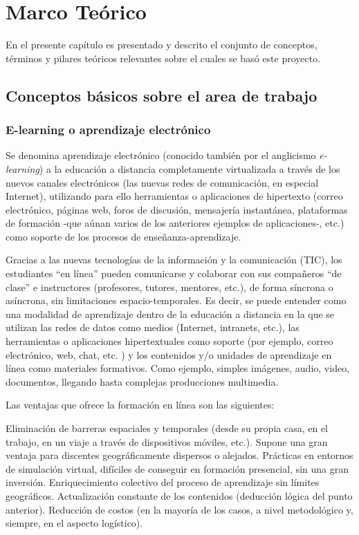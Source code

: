 \chapter{Marco Teórico}
\thispagestyle{empty} %

En el presente capítulo es presentado y descrito el conjunto de conceptos, términos y pilares teóricos relevantes sobre el cuales se basó este proyecto.

\section{Conceptos básicos sobre el area de trabajo}

\subsection{E-learning o aprendizaje electrónico}

Se denomina aprendizaje electrónico (conocido también por el anglicismo \emph{e-learning}) a la educación a distancia completamente virtualizada a través de los nuevos canales electrónicos (las nuevas redes de comunicación, en especial Internet), utilizando para ello herramientas o aplicaciones de hipertexto (correo electrónico, páginas web, foros de discusión, mensajería instantánea, plataformas de formación -que aúnan varios de los anteriores ejemplos de aplicaciones-, etc.) como soporte de los procesos de enseñanza-aprendizaje.

Gracias a las nuevas tecnologías de la información y la comunicación (TIC), los estudiantes “en línea” pueden comunicarse y colaborar con sus compañeros “de clase” e instructores (profesores, tutores, mentores, etc.), de forma síncrona o asíncrona, sin limitaciones espacio-temporales. Es decir, se puede entender como una modalidad de aprendizaje dentro de la educación a distancia en la que se utilizan las redes de datos como medios (Internet, intranets, etc.), las herramientas o aplicaciones hipertextuales como soporte (por ejemplo, correo electrónico, web, chat, etc. ) y los contenidos y/o unidades de aprendizaje en línea como materiales formativos. Como ejemplo, simples imágenes, audio, video, documentos, llegando hasta complejas producciones multimedia.

Las ventajas que ofrece la formación en línea son las siguientes:

Eliminación de barreras espaciales y temporales (desde su propia casa, en el trabajo, en un viaje a través de dispositivos móviles, etc.). Supone una gran ventaja para discentes geográficamente dispersos o alejados.
Prácticas en entornos de simulación virtual, difíciles de conseguir en formación presencial, sin una gran inversión.
Enriquecimiento colectivo del proceso de aprendizaje sin límites geográficos.
Actualización constante de los contenidos (deducción lógica del punto anterior).
Reducción de costos (en la mayoría de los casos, a nivel metodológico y, siempre, en el aspecto logístico).


